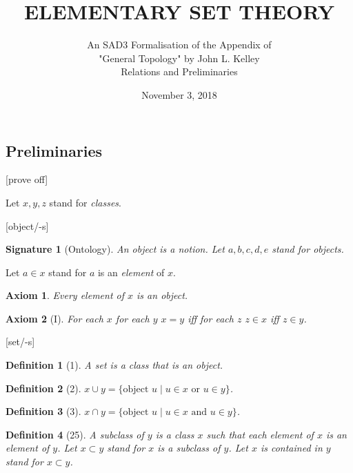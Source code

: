 \documentclass{scrartcl}
\newenvironment{forthel}{\begin{leftbar}}{\end{leftbar}}
\newtheorem*{axiom}{Axiom}
\newtheorem*{definition}{Definition}
\newtheorem*{signature}{Signature}
\begin{document}
\title{ELEMENTARY SET THEORY}

\subtitle{An SAD3 Formalisation of the Appendix of \\"General Topology" 
by John L. Kelley \\
Relations and Preliminaries}

\date{November 3, 2018}

\maketitle


\subsection{Preliminaries}

\begin{forthel}

[prove off]

Let $x,y,z$ stand for \emph{classes}.


[object/-s]
\begin{signature}[Ontology] An object is a notion.
Let $a,b,c,d,e$ stand for objects.
\end{signature}

Let $a \in x$ stand for $a$ is an \emph{element} of $x$.

\begin{axiom} Every element of $x$ is an object. \end{axiom}

\begin{axiom}[I]
For each $x$ for each $y$ $x = y$ iff for each $z$ 
$z \in x$ iff $z \in y$.
\end{axiom}

[set/-s]
\begin{definition}[1] A \emph{set} is a class that is an object.
\end{definition}


\begin{definition}[2] $x \cup y = \{\text{object } u \mid u \in x \text{ or } u \in y \}$.
\end{definition}

\begin{definition}[3] $x \cap y = \{\text{object } u \mid u \in x \text{ and } u \in y \}$.
\end{definition}

\begin{definition}[25] 
A \emph{subclass} of $y$ is a class $x$ such that each element of $x$ is an
element of $y$. Let $x \subset y$ stand for $x$ is a subclass of $y$.
Let $x$ is \emph{contained} in $y$ stand for $x \subset y$.
\end{definition}


\end{forthel}
\end{document}
